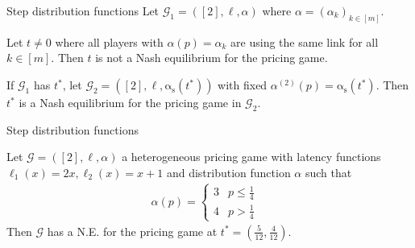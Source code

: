 \documentclass{beamer}
\newcommand{\as}{\mathrm{\alpha_s}}
\newcommand{\Gm}{\mathcal{G}}
\begin{document}
\begin{frame}{Step distribution functions}
	Let $\Gm_1 = ([2], \ell, \alpha)$ where $\alpha = (\alpha_k)_{k \in [m]}$.
	\begin{lemma}
		Let $t \ne 0$ where all players with $\alpha(p) = \alpha_k$ are using the same link for all $k \in [m]$.
		Then $t$ is not a Nash equilibrium for the pricing game.
	\end{lemma}
	\begin{theorem}
		If $\Gm_1$ has $t^*$, let $\Gm_2 = ([2], \ell, \as(t^*))$ with fixed $\alpha^{(2)}(p) = \as(t^*)$.
		Then $t^*$ is a Nash equilibrium for the pricing game in $\Gm_2$.
	\end{theorem}
\end{frame}

\begin{frame}{Step distribution functions}
	\begin{example}
		Let $\Gm = ([2], \ell, \alpha)$ a heterogeneous pricing game with latency functions $\ell_1(x) = 2x, \ell_2(x) = x + 1$ and distribution function $\alpha$ such that
		\begin{align*}
			\alpha(p) =
			\begin{cases}
				3 & p \le \tfrac14 \\
				4 & p > \tfrac14
			\end{cases}&
		\end{align*}
		Then $\Gm$ has a N.E. for the pricing game at $t^* = \left(\tfrac{5}{12}, \tfrac{4}{12}\right)$.
	\end{example}
\end{frame}
\end{document}
